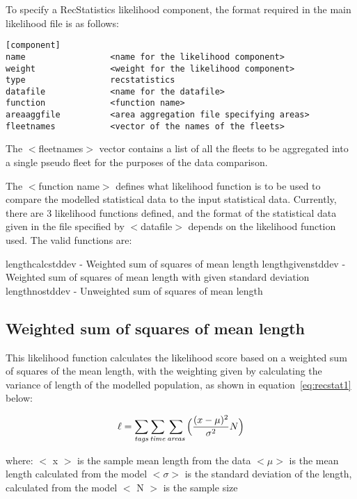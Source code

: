 \documentclass [a4paper, 10pt]{book}
\begin{document}
\bigskip
To specify a RecStatistics likelihood component, the format required in the main likelihood file is as follows:

{\small\begin{verbatim}
[component]
name                 <name for the likelihood component>
weight               <weight for the likelihood component>
type                 recstatistics
datafile             <name for the datafile>
function             <function name>
areaaggfile          <area aggregation file specifying areas>
fleetnames           <vector of the names of the fleets>
\end{verbatim}}

The $<$fleetnames$>$ vector contains a list of all the fleets to be aggregated into a single pseudo fleet for the purposes of the data comparison.

\bigskip
The $<$function name$>$ defines what likelihood function is to be used to compare the modelled statistical data to the input statistical data.  Currently, there are 3 likelihood functions defined, and the format of the statistical data given in the file specified by $<$datafile$>$ depends on the likelihood function used.  The valid functions are:

\bigskip
lengthcalcstddev - Weighted sum of squares of mean length\newline
lengthgivenstddev - Weighted sum of squares of mean length with given standard deviation\newline
lengthnostddev - Unweighted sum of squares of mean length

\subsection{Weighted sum of squares of mean length}
This likelihood function calculates the likelihood score based on a weighted sum of squares of the mean length, with the weighting given by calculating the variance of length of the modelled population, as shown in equation~\ref{eq:recstat1} below:

\begin{equation}\label{eq:recstat1}
\ell = \sum_{\it tags}\sum_{\it time}\sum_{\it areas} \Big(\frac{(x-\mu)^2} {\sigma^2} N\Big)
\end{equation}

where:\newline
$<$ x $>$ is the sample mean length from the data\newline
$<\mu>$ is the mean length calculated from the model\newline
$<\sigma>$ is the standard deviation of the length, calculated from the model\newline
$<$ N $>$ is the sample size
\end{document}
